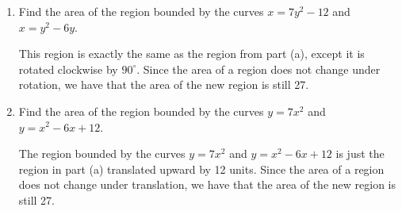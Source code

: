 \documentclass[noinstructornotes]{ximera}
\begin{document}
\begin{problem}
\begin{enumerate}
		\item  Find the area of the region bounded by the curves $x=7y^2-12$ and $x=y^2-6y$.
		\begin{freeResponse}
		This region is exactly the same as the region from part (a), except it is rotated clockwise by $90^{\circ}$.  
		Since the area of a region does not change under rotation, we have that the area of the new region is still 27.
		\end{freeResponse}
		
		\item  Find the area of the region bounded by the curves  $y = 7x^2$ and $y=x^2 - 6x + 12$.
				\begin{freeResponse}
				The region bounded by the curves $y = 7x^2$ and $y=x^2 - 6x + 12$ is just the region in part (a) translated upward by 12 units.  
				Since the area of a region does not change under translation, we have that the area of the new region is still 27.  
				\end{freeResponse}
				
				


\end{enumerate}
\end{problem}
\end{document}
